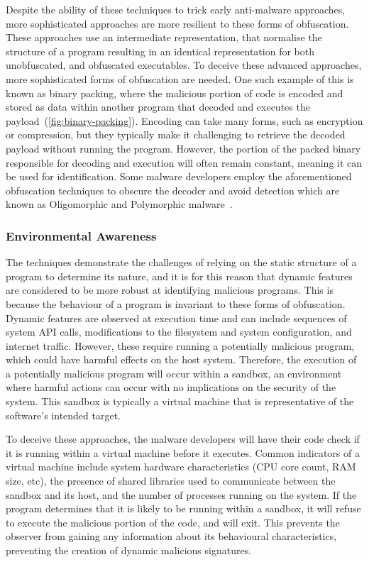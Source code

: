 \documentclass[conference,compsoc]{IEEEtran}
\begin{document}
Despite the ability of these techniques to trick early anti-malware approaches, more sophisticated approaches are more resilient to these forms of obfuscation. These approaches use an intermediate representation, that normalise the structure of a program resulting in an identical representation for both unobfuscated, and obfuscated executables. To deceive these advanced approaches, more sophisticated forms of obfuscation are needed. One such example of this is known as binary packing, where the malicious portion of code is encoded and stored as data within another program that decoded and executes the payload~(\ref{fig:binary-packing}). Encoding can take many forms, such as encryption or compression, but they typically make it challenging to retrieve the decoded payload without running the program. However, the portion of the packed binary responsible for decoding and execution will often remain constant, meaning it can be used for identification. Some malware developers employ the aforementioned obfuscation techniques to obscure the decoder and avoid detection which are known as Oligomorphic and Polymorphic malware~\cite{youMalwareObfuscationTechniques2010}. 

\subsubsection{Environmental Awareness}


The techniques demonstrate the challenges of relying on the static structure of a program to determine its nature, and it is for this reason that dynamic features are considered to be more robust at identifying malicious programs. This is because the behaviour of a program is invariant to these forms of obfuscation. Dynamic features are observed at execution time and can include sequences of system API calls, modifications to the filesystem and system configuration, and internet traffic. However, these require running a potentially malicious program, which could have harmful effects on the host system. Therefore, the execution of a potentially malicious program will occur within a sandbox, an environment where harmful actions can occur with no implications on the security of the system. This sandbox is typically a virtual machine that is representative of the software's intended target. 

To deceive these approaches, the malware developers will have their code check if it is running within a virtual machine before it executes. Common indicators of a virtual machine include system hardware characteristics (CPU core count, RAM size, etc), the presence of shared libraries used to communicate between the sandbox and its host, and the number of processes running on the system. If the program determines that it is likely to be running within a sandbox, it will refuse to execute the malicious portion of the code, and will exit. This prevents the observer from gaining any information about its behavioural characteristics, preventing the creation of dynamic malicious signatures. 
\end{document}

